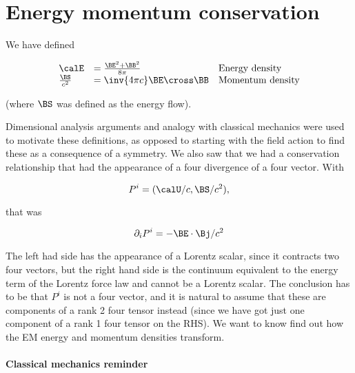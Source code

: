 %
%
\section{Energy momentum conservation}

We have defined

\begin{equation}\label{eqn:relativisticElectrodynamicsL21b:320}
\begin{array}{l l l}
\calE &= \frac{\BE^2 + \BB^2}{8\pi} & \mbox{Energy density} \\
\frac{\BS}{c^2} &= \inv{4 \pi c} \BE \cross \BB & \mbox{Momentum density}
\end{array}
\end{equation}

(where \(\BS\) was defined as the energy flow).

Dimensional analysis arguments and analogy with classical mechanics were used to motivate these definitions, as opposed to starting with the field action to find these as a consequence of a symmetry.  We also saw that we had a conservation relationship that had the appearance of a four divergence of a four vector.  With

\begin{equation}\label{eqn:relativisticElectrodynamicsL21b:340}
P^i = (\calU/c, \BS/c^2),
\end{equation}

that was

\begin{equation}\label{eqn:relativisticElectrodynamicsL21b:360}
\partial_i P^i = - \BE \cdot \Bj/c^2
\end{equation}

The left had side has the appearance of a Lorentz scalar, since it contracts two four vectors, but the right hand side is the continuum equivalent to the energy term of the Lorentz force law and cannot be a Lorentz scalar.  The conclusion has to be that \(P^i\) is not a four vector, and it is natural to assume that these are components of a rank 2 four tensor instead (since we have got just one component of a rank 1 four tensor on the RHS).  We want to know find out how the EM energy and momentum densities transform.

\paragraph{Classical mechanics reminder}

